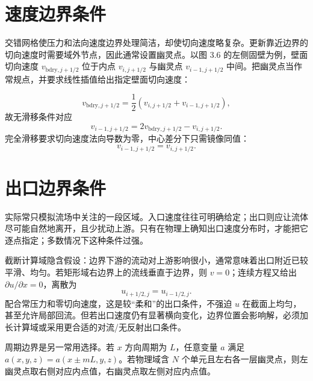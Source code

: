 \documentclass[11pt,a4paper,openany,fontset=none]{ctexbook}
\newenvironment{sourceblock}
  {\par\addvspace{0.65\baselineskip}\noindent\begin{minipage}{\linewidth}\centering}
  {\end{minipage}\par\addvspace{0.48\baselineskip}}
\begin{document}
\section{速度边界条件}

交错网格使压力和法向速度边界处理简洁，却使切向速度略复杂。更新靠近边界的切向速度时需要域外节点，因此通常设置幽灵点。以图 3.6 的左侧固壁为例，壁面切向速度 $v_{\mathrm{bdry},j+1/2}$ 位于内点 $v_{i,j+1/2}$ 与幽灵点 $v_{i-1,j+1/2}$ 中间。把幽灵点当作常规点，并要求线性插值给出指定壁面切向速度：

\begin{sourceblock}
\end{sourceblock}
\begin{equation}
 v_{\mathrm{bdry},j+1/2}=\frac12(v_{i,j+1/2}+v_{i-1,j+1/2}), \tag{3.53}
\end{equation}
故无滑移条件对应
\begin{equation}
 v_{i-1,j+1/2}=2v_{\mathrm{bdry},j+1/2}-v_{i,j+1/2}. \tag{3.54}
\end{equation}
完全滑移要求切向速度法向导数为零，中心差分下只需镜像同值：
\begin{equation}
 v_{i-1,j+1/2}=v_{i,j+1/2}. \tag{3.55}
\end{equation}

\section{出口边界条件}

实际常只模拟流场中关注的一段区域。入口速度往往可明确给定；出口则应让流体尽可能自然地离开，且少扰动上游。只有在物理上确知出口速度分布时，才能把它逐点指定；多数情况下这种条件过强。

截断计算域隐含假设：边界下游的流动对上游影响很小，通常意味着出口附近已较平滑、均匀。若矩形域右边界上的流线垂直于边界，则 $v=0$；连续方程又给出 $\partial u/\partial x=0$，离散为
\begin{equation}
 u_{i+1/2,j}=u_{i-1/2,j}. \tag{3.56}
\end{equation}
配合常压力和零切向速度，这是较“柔和”的出口条件，不强迫 $u$ 在截面上均匀，甚至允许局部回流。但若出口速度仍有显著横向变化，边界位置会影响解，必须加长计算域或采用更合适的对流/无反射出口条件。

周期边界是另一常用选择。若 $x$ 方向周期为 $L$，任意变量 $a$ 满足 $a(x,y,z)=a(x\pm mL,y,z)$。若物理域含 $N$ 个单元且左右各一层幽灵点，则左幽灵点取右侧对应内点值，右幽灵点取左侧对应内点值。
\end{document}
